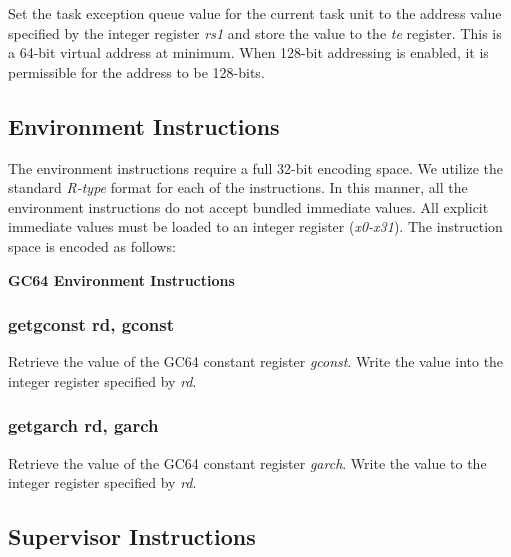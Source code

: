 \documentclass{article}
\begin{document}
Set the task exception queue value for the current task unit to the address value
specified by the integer register \emph{rs1} and store the value to the
\emph{te} register.  This is a 64-bit virtual address at minimum.  
When 128-bit addressing is enabled, it is permissible for the address to be 128-bits.


\subsection{Environment Instructions}

The environment instructions require a full 32-bit encoding space.  We utilize 
the standard \emph{R-type} format for each of the instructions.  In this manner, 
all the environment instructions do not accept bundled immediate values.  All
explicit immediate values must be loaded to an integer register (\emph{x0-x31}).  
The instruction space is encoded as follows: 

\begin{center}
\textbf{GC64 Environment Instructions}
\makebox[0.03in][s]{}\makebox[0.03in][s]{}\makebox[0.03in][s]{}\makebox[0.03in][s]{}\makebox[0.03in][s]{}
\end{center}

\subsubsection{getgconst rd, gconst}

Retrieve the value of the GC64 constant register \emph{gconst}.  Write
the value into the integer register specified by \emph{rd}.

\subsubsection{getgarch rd, garch}
Retrieve the value of the GC64 constant register \emph{garch}.  Write
the value to the integer register specified by \emph{rd}.  

\subsection{Supervisor Instructions}
\end{document}
